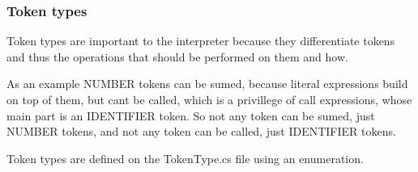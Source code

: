 \subsubsection{Token types}

Token types are important to the interpreter because they differentiate tokens and thus the operations that should be
performed on them and how.
\par
As an example NUMBER tokens can be sumed, because literal expressions build on top of them, but cant be called, which
is a privillege of call expressions, whose main part is an IDENTIFIER token.
So not any token can be sumed, just NUMBER tokens, and not any token can be called, just IDENTIFIER tokens.
\par
Token types are defined on the TokenType.cs file using an enumeration.

